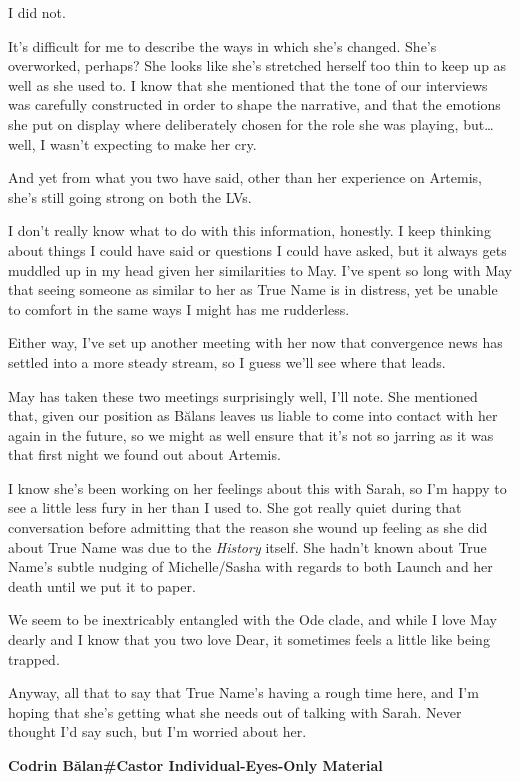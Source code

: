 I did not.

It's difficult for me to describe the ways in which she's changed. She's overworked, perhaps? She looks like she's stretched herself too thin to keep up as well as she used to. I know that she mentioned that the tone of our interviews was carefully constructed in order to shape the narrative, and that the emotions she put on display where deliberately chosen for the role she was playing, but\ldots well, I wasn't expecting to make her cry.

And yet from what you two have said, other than her experience on Artemis, she's still going strong on both the LVs.

I don't really know what to do with this information, honestly. I keep thinking about things I could have said or questions I could have asked, but it always gets muddled up in my head given her similarities to May. I've spent so long with May that seeing someone as similar to her as True Name is in distress, yet be unable to comfort in the same ways I might has me rudderless.

Either way, I've set up another meeting with her now that convergence news has settled into a more steady stream, so I guess we'll see where that leads.

May has taken these two meetings surprisingly well, I'll note. She mentioned that, given our position as Bălans leaves us liable to come into contact with her again in the future, so we might as well ensure that it's not so jarring as it was that first night we found out about Artemis.

I know she's been working on her feelings about this with Sarah, so I'm happy to see a little less fury in her than I used to. She got really quiet during that conversation before admitting that the reason she wound up feeling as she did about True Name was due to the \emph{History} itself. She hadn't known about True Name's subtle nudging of Michelle/Sasha with regards to both Launch and her death until we put it to paper.

We seem to be inextricably entangled with the Ode clade, and while I love May dearly and I know that you two love Dear, it sometimes feels a little like being trapped.

Anyway, all that to say that True Name's having a rough time here, and I'm hoping that she's getting what she needs out of talking with Sarah. Never thought I'd say such, but I'm worried about her.

\textbf{Codrin Bălan\#Castor Individual-Eyes-Only Material}

